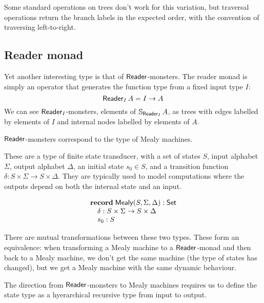 Some standard operations on trees don't work for this variation, but traversal operations return the branch labels in the expected order, with the convention of traversing left-to-right. 

\subsection{Reader monad}

Yet another interesting type is that of $\mathsf{Reader}$-monsters.
The reader monad is simply an operator that generates the function type from a fixed input type $I$:
$$
\mathsf{Reader}_I\,A = I \rightarrow A
$$
We can see $\mathsf{Reader}_I$-monsters, elements of $\mathbb{S}_{\mathsf{Reader}_I}\,A$, as trees with edges labelled by elements of $I$ and internal nodes labelled by elements of $A$.

$\mathsf{Reader}$-monsters correspond to the type of Mealy machines. 

These are a type of finite state transducer, with a set of states $S$, input alphabet $\Sigma$, output alphabet $\Delta$, an initial state $s_0 \in S$, and a transition function $\delta : S \times \Sigma \to S \times \Delta$. They are typically used to model computations where the outputs depend on both the internal state and an input.

$$
\begin{array}[t]{l}
\mathbf{record}\;
\mathsf{Mealy}(S,\Sigma,\Delta):\mathsf{Set}\\
\quad \delta : S \times \Sigma \to S \times \Delta \\
\quad s_0 : S
\end{array}
$$

There are mutual transformations between these two types.
These form an equivalence: when transforming a Mealy machine to a $\mathsf{Reader}$-monad and then back to a Mealy machine, we don't get the same machine (the type of states has changed), but we get a Mealy machine with the same dynamic behaviour.

The direction from $\mathsf{Reader}$-monsters to Mealy machines requires us to define the state type as a hyerarchical recursive type from input to output.




